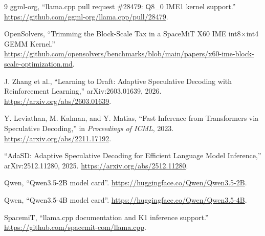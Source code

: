 \documentclass[10pt,twocolumn]{article}
\begin{document}
\balance
\begin{thebibliography}{9}
ggml-org, ``llama.cpp pull request \#28479: Q8\_0 IME1 kernel support.''
\url{https://github.com/ggml-org/llama.cpp/pull/28479}.

OpenSolvers, ``Trimming the Block-Scale Tax in a SpaceMiT X60 IME int8$\times$int4 GEMM Kernel.''
\url{https://github.com/opensolvers/benchmarks/blob/main/papers/x60-ime-block-scale-optimization.md}.

J. Zhang et al., ``Learning to Draft: Adaptive Speculative Decoding with Reinforcement Learning,'' arXiv:2603.01639, 2026.
\url{https://arxiv.org/abs/2603.01639}.

Y. Leviathan, M. Kalman, and Y. Matias, ``Fast Inference from Transformers via Speculative Decoding,'' in \emph{Proceedings of ICML}, 2023.
\url{https://arxiv.org/abs/2211.17192}.

``AdaSD: Adaptive Speculative Decoding for Efficient Language Model Inference,'' arXiv:2512.11280, 2025.
\url{https://arxiv.org/abs/2512.11280}.

Qwen, ``Qwen3.5-2B model card''.
\url{https://huggingface.co/Qwen/Qwen3.5-2B}.

Qwen, ``Qwen3.5-4B model card''.
\url{https://huggingface.co/Qwen/Qwen3.5-4B}.

SpacemiT, ``llama.cpp documentation and K1 inference support.''
\url{https://github.com/spacemit-com/llama.cpp}.
\end{thebibliography}
\end{document}
